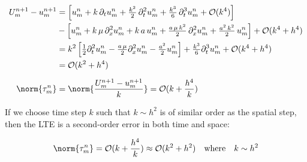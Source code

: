 \begin{align*}
  U_m^{n+1} - u_m^{n+1} & =
  \left[ u_m^n + k\,\partial_t u_m^n + \tfrac{k^2}{2}\,\partial_t^2 u_m^n + \tfrac{k^3}{6}\,\partial_t^3 u_m^n + \mathcal{O}(k^4) \right]                                                            \\
                        & - \left[ u_m^n + k\,\mu\,\partial_{x}^2 u_m^n + k\,a\,u_m^n + \tfrac{a\,\mu\,k^2}{2}\,\partial_{x}^2 u_m^n + \tfrac{a^2\,k^2}{2}\,u_m^n \right] + \mathcal{O}(k^4+h^4)     \\
                        & = k^2 \left[\tfrac{1}{2}\partial_t^2 u_m^n - \tfrac{a \,\mu}{2}\partial_{x}^2 u_m^n - \tfrac{a^2}{2}u_m^n\right] + \tfrac{k^3}{6}\partial_t^3 u_m^n + \mathcal{O}(k^4+h^4) \\
                        & = \mathcal{O}(k^2 + h^4)                                                                                                                                                   \\[2mm]
  \norm{\tau_m^n}       & = \norm{\frac{U_m^{n+1} - u_m^{n+1}}{k}} = \mathcal{O}(k + \frac{h^4}{k})                                                                                                  \\
\end{align*}

If we choose time step \(k\) such that \(k \sim h^2\) is of similar order as the spatial step, then the LTE is a second-order error in both time and space:

\begin{equation}
  \norm{\tau_m^n} = \mathcal{O}(k + \frac{h^4}{k}) \approx \mathcal{O}(k^2 + h^2) \quad \text{where} \quad k \sim h^2
\end{equation}